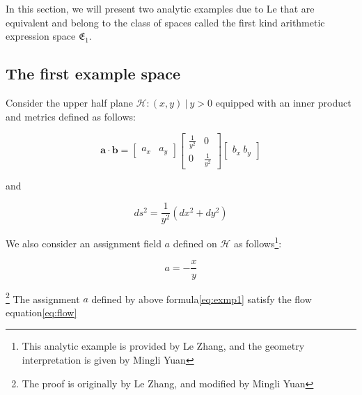
In this section, we will present two analytic examples due to Le that are equivalent and belong to the class of spaces
called the first kind arithmetic expression space $\mathfrak{E}_1$.

\subsection{The first example space}\label{subsec:exmp1}

Consider the upper half plane ${\mathcal{H}: (x, y) \ | \ y > 0}$ equipped with an inner product and metrics defined as follows:

$$
\mathbf{a} \cdot \mathbf{b} = \begin{bmatrix} a_x & a_y \end{bmatrix} \begin{bmatrix} \frac{1}{y^2} & 0 \\ 0 & \frac{1}{y^2} \end{bmatrix} \begin{bmatrix} b_x \ b_y \end{bmatrix}
$$

and

$$
ds^2 = \frac{1}{y^2} (dx^2 + dy^2)
$$

We also consider an assignment field $a$ defined on $\mathcal{H}$ as follows\footnote{This analytic example is provided by Le Zhang, and the geometry interpretation is given by Mingli Yuan}:

\begin{equation}\label{eq:exmp1}
a = - \frac{x}{y}
\end{equation}

\begin{theorem}\footnote{The proof is originally by Le Zhang, and modified by Mingli Yuan}
The assignment $a$ defined by above formula\eqref{eq:exmp1} satisfy the flow equation\eqref{eq:flow}
\end{theorem}

